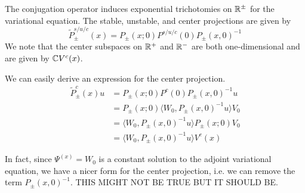 \documentclass[thesis.tex]{subfiles}
\begin{document}
The conjugation operator induces exponential trichotomies on $\mathbb{R}^\pm$ for the variational equation. The stable, unstable, and center projections are given by
\begin{equation}\label{trichotomyprojunconj}
\tilde{P}^{s/u/c}_\pm(x) = P_\pm(x; 0) P^{s/u/c}(0) P_\pm(x, 0)^{-1}
\end{equation}
We note that the center subspaces on $\mathbb{R}^+$ and $\mathbb{R}^-$ are both one-dimensional and are given by $\mathbb{C} V^c(x)$. 

We can easily derive an expression for the center projection.
\begin{align*}
\tilde{P}^c_\pm(x) u &= P_\pm(x; 0) P^c(0) P_\pm(x, 0)^{-1} u \\
&= P_\pm(x; 0) \langle W_0, P_\pm(x, 0)^{-1} u \rangle V_0 \\
&= \langle W_0, P_\pm(x, 0)^{-1} u \rangle P_\pm(x; 0) V_0\\
&= \langle W_0, P_\pm(x, 0)^{-1} u \rangle V^c(x)
\end{align*}

In fact, since $\Psi^(x) = W_0$ is a constant solution to the adjoint variational equation, we have a nicer form for the center projection, i.e. we can remove the term $P_\pm(x, 0)^{-1}$. THIS MIGHT NOT BE TRUE BUT IT SHOULD BE.
\end{document}
